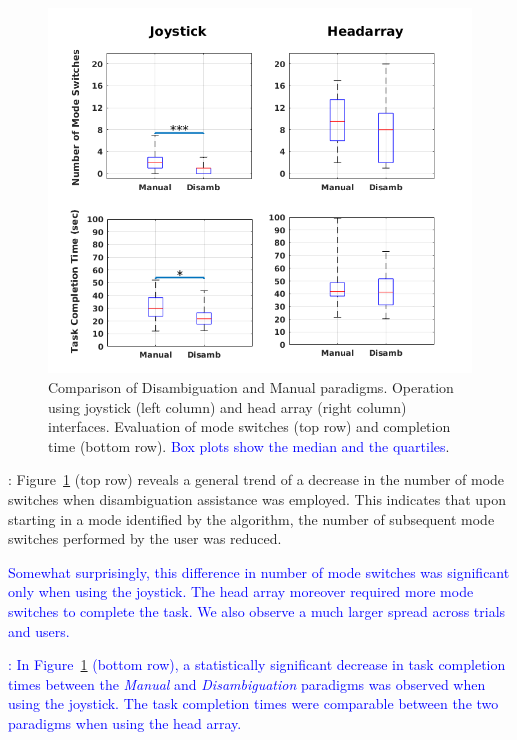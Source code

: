 \documentclass[conference]{IEEEtran}
\begin{document}
\begin{figure}[t]
	\centering
	\includegraphics[width = 1.15\hsize ,center]{./figures/FINAL_BOXPLOT.png}
	\vspace{-0.7cm}
	\caption{Comparison of Disambiguation and Manual paradigms. Operation using joystick (left column) and head array (right column) interfaces. Evaluation of mode switches (top row) and completion time (bottom row). \textcolor{blue}{Box plots show the median and the quartiles}.}
	\label{DATAPLOT}
\end{figure}
\vspace{0.1cm}
: Figure~\ref{DATAPLOT} (top row) reveals a general trend of a decrease in the number of mode switches when disambiguation assistance was employed. This indicates that upon starting in a mode identified by the algorithm, the number of subsequent mode switches performed by the user was reduced.
 
\textcolor{blue}{Somewhat surprisingly, this difference in number of mode switches was significant only when using the joystick. The head array moreover required more mode switches to complete the task. We also observe a much larger spread across trials and users.}

\vspace{0.1cm}
\textcolor{blue}{: 
In Figure~\ref{DATAPLOT} (bottom row), a statistically significant decrease in task completion times between the \textit{Manual} and \textit{Disambiguation} paradigms was observed when using the joystick. The task completion times were comparable between the two paradigms when using the head array. }
\end{document}
